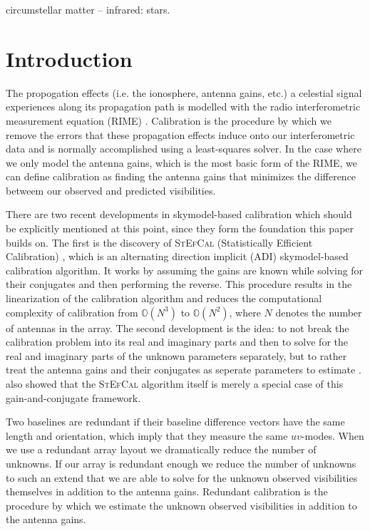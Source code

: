\documentclass[useAMS,usenatbib]{mn2e}
\begin{document}
\begin{keywords}
circumstellar matter -- infrared: stars.
\end{keywords}

\section{Introduction}
The propogation effects (i.e. the ionosphere, antenna gains, etc.) a celestial signal experiences along its propagation path is modelled with the radio interferometric measurement equation (RIME) \citep{ME1,RRIME1}.
Calibration is the procedure by which we remove the errors that these propagation effects induce onto our interferometric data and is normally accomplished using a 
least-squares solver. In the case where we only model the antenna gains, which is the most basic form of the RIME, we can define calibration as finding the antenna gains that minimizes the difference betweem our observed and predicted visibilities. 

There are two recent developments in skymodel-based calibration which should be explicitly mentioned at this point, since they form the foundation this paper builds on. The first is the discovery of \textsc{StEfCal} (Statistically Efficient Calibration) \citep{Mitchell:MWA-cal,Salvini2014}, which 
is an alternating direction implicit (ADI) skymodel-based calibration algorithm. It works by assuming the gains are known while solving for their conjugates and then performing the reverse. 
This procedure results in the linearization of the calibration algorithm and reduces the computational complexity of calibration from $\mathbb{O}(N^3)$ to $\mathbb{O}(N^2)$, where $N$ denotes the number of antennas in the array. 
The second development is the idea: to not break the calibration problem 
into its real and imaginary parts and then to solve for the real and imaginary parts of the unknown parameters separately, but to rather treat the antenna gains and their 
conjugates as seperate parameters to estimate \citep{Smirnov2015}. \citet{Smirnov2015} also showed that the \textsc{StEfCal} algorithm itself is merely a special case of this
gain-and-conjugate framework. 

Two baselines are redundant if their baseline difference vectors have the same length and orientation, which imply that they measure the same $uv$-modes. When we use a redundant array layout we dramatically 
reduce the number of unknowns. If our array is redundant enough we reduce the number of unknowns to such an extend that we are able to solve for the unknown 
observed visibilities themselves in addition to the antenna gains. Redundant calibration is the procedure by which we estimate the unknown observed visibilities in addition
to the antenna gains.
\end{document}
